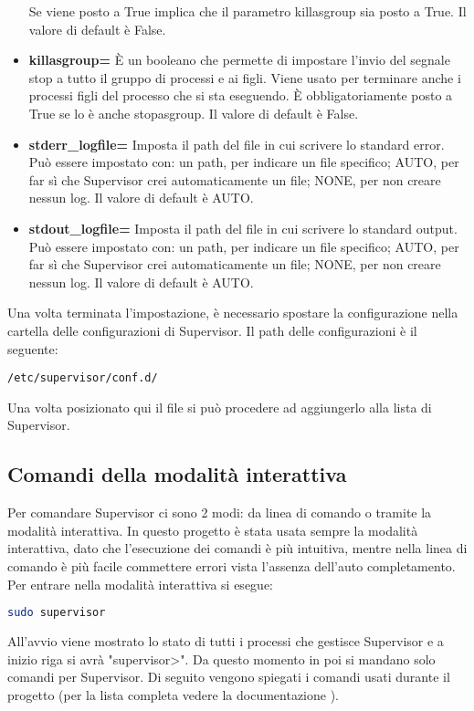 \begin{itemize}
	Se viene posto a True implica che il parametro killasgroup sia posto a True.
	Il valore di default è False.
	\item \textbf{killasgroup=}\newline
	È un booleano che permette di impostare l'invio del segnale stop a tutto il gruppo di processi e ai figli.
	Viene usato per terminare anche i processi figli del processo che si sta eseguendo.
	È obbligatoriamente posto a True se lo è anche stopasgroup.
	Il valore di default è False.
	\item \textbf{stderr\_logfile=}\newline
	Imposta il path del file in cui scrivere lo standard error.
	Può essere impostato con: 
	un path, per indicare un file specifico; 
	AUTO, per far sì che Supervisor crei automaticamente un file;
	NONE, per non creare nessun log.
	Il valore di default è AUTO.
	\item \textbf{stdout\_logfile=}\newline
	Imposta il path del file in cui scrivere lo standard output.
	Può essere impostato con: 
	un path, per indicare un file specifico; 
	AUTO, per far sì che Supervisor crei automaticamente un file;
	NONE, per non creare nessun log.
	Il valore di default è AUTO.
\end{itemize}
Una volta terminata l'impostazione, è necessario spostare la configurazione nella cartella delle configurazioni di Supervisor.
\hypertarget{lst:client-supervisor-path}{Il path delle configurazioni è il seguente:} 
\begin{lstlisting}[language=textnonum]
    /etc/supervisor/conf.d/
\end{lstlisting}
Una volta posizionato qui il file si può procedere ad aggiungerlo alla lista di Supervisor.

\subsection{Comandi della modalità interattiva}
\label{subsec:client-supervisor-comandi}
Per comandare Supervisor ci sono 2 modi:
da linea di comando o tramite la modalità interattiva.
In questo progetto è stata usata sempre la modalità interattiva, dato che l'esecuzione dei comandi è più intuitiva,
mentre nella linea di comando è più facile commettere errori vista l'assenza dell'auto completamento.
Per entrare nella modalità interattiva si esegue:
\begin{lstlisting}[language=bash]
	sudo supervisor
\end{lstlisting}
All'avvio viene mostrato lo stato di tutti i processi che gestisce Supervisor e a inizio riga si avrà "supervisor>".
Da questo momento in poi si mandano solo comandi per Supervisor.
Di seguito vengono spiegati i comandi usati durante il progetto  
(per la lista completa vedere la documentazione \cite{client-supervisor-comandi}).

